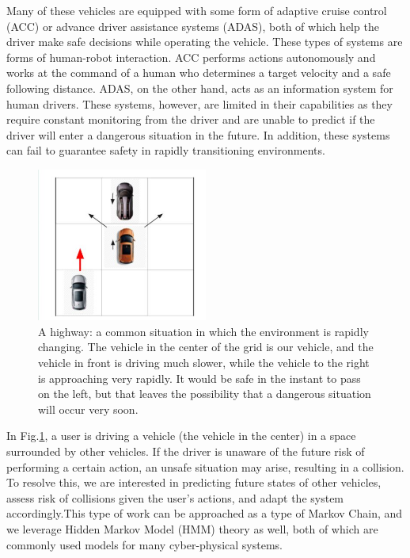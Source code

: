 \documentclass[letterpaper, 10 pt, conference]{ieeeconf}  %
\begin{document}
    Many of these vehicles are equipped with some form of adaptive cruise control (ACC) or advance driver assistance systems (ADAS), both of which help the driver make safe decisions while operating the vehicle. These types of systems are forms of human-robot interaction. ACC performs actions autonomously and works at the command of a human who determines a target velocity and a safe following distance. ADAS, on the other hand, acts as an information system for human drivers. These systems, however, are limited in their capabilities as they require constant monitoring from the driver and are unable to predict if the driver will enter a dangerous situation in the future. In addition, these systems can fail to guarantee safety in rapidly transitioning environments.
    

\begin{figure}[ht]
    \includegraphics[width=0.5\textwidth]{highwaysit.JPG}
    \caption{A highway: a common situation in which the environment is rapidly changing. The vehicle in the center of the grid is our vehicle, and the vehicle in front is driving much slower, while the vehicle to the right is approaching very rapidly. It would be safe in the instant to pass on the left, but that leaves the possibility that a dangerous situation will occur very soon.}
    \label{fig:hiway}
\end{figure}
    
    In Fig.\ref{fig:hiway}, a  user is driving a vehicle (the vehicle in the center) in a space surrounded by other vehicles. If the driver is unaware of the future risk of performing a certain action, an unsafe situation may arise, resulting in a collision. To resolve this, we are interested in predicting future states of other vehicles, assess risk of collisions given the user's actions, and adapt the system accordingly.This type of work can be approached as a type of Markov Chain, and we leverage Hidden Markov Model (HMM) theory as well, both of which are commonly used models for many cyber-physical systems.
    
\end{document}
